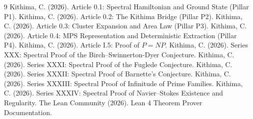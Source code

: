 \documentclass[11pt,a4paper]{article}
\begin{document}

\begin{thebibliography}{9}
  Kithima, C. (2026). Article 0.1: Spectral Hamiltonian and Ground State (Pillar P1).
  Kithima, C. (2026). Article 0.2: The Kithima Bridge (Pillar P2).
  Kithima, C. (2026). Article 0.3: Cluster Expansion and Area Law (Pillar P3).
  Kithima, C. (2026). Article 0.4: MPS Representation and Deterministic Extraction (Pillar P4).
  Kithima, C. (2026). Article I.5: Proof of \(P = NP\).
  Kithima, C. (2026). Series XXX: Spectral Proof of the Birch–Swinnerton-Dyer Conjecture.
  Kithima, C. (2026). Series XXXI: Spectral Proof of the Fuglede Conjecture.
  Kithima, C. (2026). Series XXXII: Spectral Proof of Barnette's Conjecture.
  Kithima, C. (2026). Series XXXIII: Spectral Proof of Infinitude of Prime Families.
  Kithima, C. (2026). Series XXXIV: Spectral Proof of Navier–Stokes Existence and Regularity.
  The Lean Community (2026). Lean 4 Theorem Prover Documentation.
\end{thebibliography}
\end{document}
